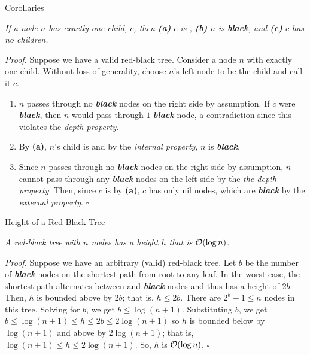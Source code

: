\documentclass[aspectratio=169]{beamer}
\newcommand{\textib}[1]{\textit{\textbf{{#1}}}}
\newcommand{\red}{\textib{\color{red}{red }}}
\newcommand{\proposition}[1]{\begin{tcolorbox}[title={Proposition}]\small{\textit{{#1}}}\end{tcolorbox}}
\newcommand{\thm}[1]{\begin{tcolorbox}[title={Theorem}]\small{\textit{{#1}}}\end{tcolorbox}}
\begin{document}
\begin{frame}{Corollaries}
    \proposition{
        If a node $n$ has exactly one child, $c$, then 
        \textnormal{\textbf{(a)}} $c$ is \red,
        \textnormal{\textbf{(b)}} $n$ is \textib{black}, and
        \textnormal{\textbf{(c)}} $c$ has no children.
    }
    \textit{Proof.}
    Suppose we have a valid red-black tree. Consider a node $n$ with exactly one child. 
    Without loss of generality, choose $n$'s left node to be the child and call it $c$.
    \begin{enumerate}[label=\textbf{(\alph*)}]
        \item $n$ passes through no \textib{black} nodes on the right side by assumption. If $c$ were 
            \textib{black}, then $n$ would pass through $1$ \textib{black} node, a contradiction 
            since this violates the \textit{depth property}.
        \item By \textbf{(a)}, $n$'s child is \red and by the \textit{internal property}, $n$ is \textib{black}.
        \item Since $n$ passes through no \textib{black} nodes on the right side by assumption,
            $n$ cannot pass through any \textib{black} nodes on the left side by the \textit{the depth
            property}. Then, since $c$ is \red by \textbf{(a)}, $c$ has only nil nodes, which are 
            \textib{black} by the \textit{external property}. \hfill $\square$
    \end{enumerate}
\end{frame}

\begin{frame}{Height of a Red-Black Tree}
    \thm{
        A red-black tree with $n$ nodes has a height $h$ that is ${\cal{O}} (\log n)$.
    }
    \textit{Proof.}
    Suppose we have an arbitrary (valid) red-black tree. Let $b$ be the number of \textib{black} nodes
    on the shortest path from root to any leaf. In the worst case, the shortest path alternates 
    between \red and \textib{black} nodes and thus has a height of $2b$. Then, $h$ is bounded above 
    by $2b$; that is, $h \leq 2b$. There are $2^b - 1 \leq n$ nodes in this tree. Solving for $b$, 
    we get $b \leq \log(n + 1)$. Substituting $b$, we get $b \leq \log(n + 1) \leq h \leq 2b \leq 
    2\log(n + 1)$ so $h$ is bounded below by $\log(n + 1)$ and above by $2\log(n + 1)$; that is, 
    $\log(n + 1) \leq h \leq 2\log(n + 1)$. So, $h$ is ${\cal{O}} (\log n)$. \hfill $\square$ 
\end{frame}
\end{document}
